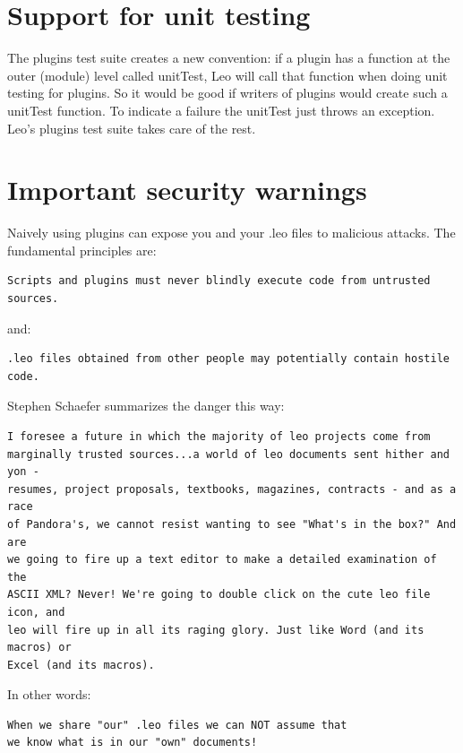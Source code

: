 \documentclass[a4paper,10pt,english]{sphinxmanual}
\begin{document}
\section{Support for unit testing}
\label{writingPlugins:support-for-unit-testing}
The plugins test suite creates a new convention: if a plugin has a function at
the outer (module) level called unitTest, Leo will call that function when
doing unit testing for plugins. So it would be good if writers of plugins would
create such a unitTest function. To indicate a failure the unitTest just
throws an exception. Leo's plugins test suite takes care of the rest.


\section{Important security warnings}
\label{writingPlugins:important-security-warnings}
Naively using plugins can expose you and your .leo files to malicious attacks.
The fundamental principles are:

\begin{Verbatim}[commandchars=\\\{\}]
Scripts and plugins must never blindly execute code from untrusted sources.
\end{Verbatim}

and:

\begin{Verbatim}[commandchars=\\\{\}]
.leo files obtained from other people may potentially contain hostile code.
\end{Verbatim}

Stephen Schaefer summarizes the danger this way:

\begin{Verbatim}[commandchars=\\\{\}]
I foresee a future in which the majority of leo projects come from
marginally trusted sources...a world of leo documents sent hither and yon -
resumes, project proposals, textbooks, magazines, contracts - and as a race
of Pandora's, we cannot resist wanting to see "What's in the box?" And are
we going to fire up a text editor to make a detailed examination of the
ASCII XML? Never! We're going to double click on the cute leo file icon, and
leo will fire up in all its raging glory. Just like Word (and its macros) or
Excel (and its macros).
\end{Verbatim}

In other words:

\begin{Verbatim}[commandchars=\\\{\}]
When we share "our" .leo files we can NOT assume that
we know what is in our "own" documents!
\end{Verbatim}
\end{document}
